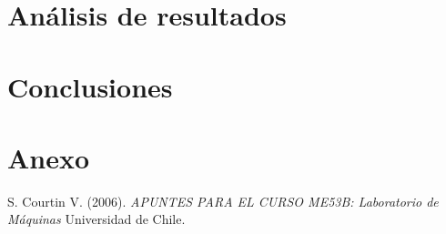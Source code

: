 \documentclass[11pt,letterpaper]{extarticle}        %
\numberwithin{equation}{section}                    %
\begin{document}
\section{Análisis de resultados}
\section{Conclusiones}


\newpage
\section{Anexo}

\begin{thebibliography}{x}
	
		S. Courtin V. (2006). \textit{APUNTES PARA EL CURSO ME53B: Laboratorio de Máquinas} Universidad de Chile.
	

\end{thebibliography}
\end{document}

